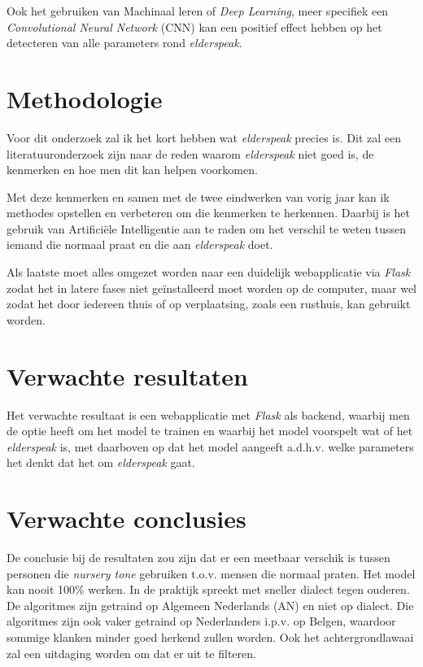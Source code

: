 \documentclass{hogent-article}
\begin{document}
Ook het gebruiken van Machinaal leren of \textit{Deep Learning}, meer specifiek een \textit{Convolutional Neural Network} (CNN) kan een positief effect hebben op het detecteren van alle parameters rond \textit{elderspeak}.

\section{Methodologie}\label{sec:methodologie}
Voor dit onderzoek zal ik het kort hebben wat \textit{elderspeak} precies is. Dit zal een literatuuronderzoek zijn naar de reden waarom \textit{elderspeak} niet goed is, de kenmerken en hoe men dit kan helpen voorkomen.

Met deze kenmerken en samen met de twee eindwerken van vorig jaar kan ik methodes opstellen en verbeteren om die kenmerken te herkennen. Daarbij is het gebruik van Artificiële Intelligentie aan te raden om het verschil te weten tussen iemand die normaal praat en die aan \textit{elderspeak} doet.

Als laatste moet alles omgezet worden naar een duidelijk webapplicatie via \textit{Flask} zodat het in latere fases niet geïnstalleerd moet worden op de computer, maar wel zodat het door iedereen thuis of op verplaatsing, zoals een rusthuis, kan gebruikt worden.


\section{Verwachte resultaten}\label{sec:verwachte-resultaten}
Het verwachte resultaat is een webapplicatie met \textit{Flask} als backend, waarbij men de optie heeft om het model te trainen en waarbij het model voorspelt wat of het \textit{elderspeak} is, met daarboven op dat het model aangeeft a.d.h.v. welke parameters het denkt dat het om \textit{elderspeak} gaat.

\section{Verwachte conclusies}\label{sec:verwachte-conclusies}
De conclusie bij de resultaten zou zijn dat er een meetbaar verschik is tussen personen die \textit{nursery tone} gebruiken t.o.v. mensen die normaal praten. Het model kan nooit 100\% werken. In de praktijk spreekt met sneller dialect tegen ouderen. De algoritmes zijn getraind op Algemeen Nederlands (AN) en niet op dialect. Die algoritmes zijn ook vaker getraind op Nederlanders i.p.v. op Belgen, waardoor sommige klanken minder goed herkend zullen worden. Ook het achtergrondlawaai zal een uitdaging worden om dat er uit te filteren.
\end{document}
